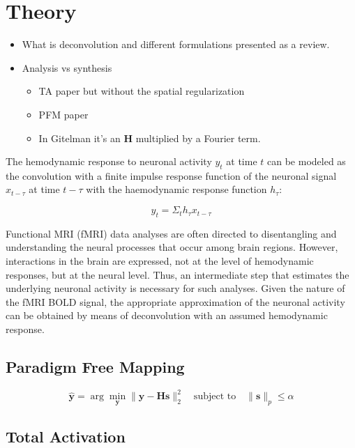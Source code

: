 \section{Theory}

\begin{itemize}
    \item What is deconvolution and different formulations presented as a review.
    \item Analysis vs synthesis
    \begin{itemize}
        \item TA paper but without the spatial regularization
        \item PFM paper
        \item In Gitelman it's an \(\mathbf{H}\) multiplied by a Fourier term.
    \end{itemize}
\end{itemize}

The hemodynamic response to neuronal activity \(y_t\) at time \(t\) can be modeled as the convolution with a finite impulse response function of the neuronal signal \(x_{t-\tau}\) at time \(t-\tau\) with the haemodynamic response function \(h_{\tau}\):

\begin{equation}
    y_t = \Sigma_t h_{\tau} x_{t-\tau}
\end{equation}

Functional MRI (fMRI) data analyses are often directed to disentangling and understanding the neural processes that occur among brain regions. However, interactions in the brain are expressed, not at the level of hemodynamic responses, but at the neural level. Thus, an intermediate step that estimates the underlying neuronal activity is necessary for such analyses. Given the nature of the fMRI BOLD signal, the appropriate approximation of the neuronal activity can be obtained by means of deconvolution with an assumed hemodynamic response\cite{gitelman2003modeling}.

\subsection{Paradigm Free Mapping}

\begin{equation}
    \hat{\mathbf{y}} = \arg \min_{\mathbf{y}} \| \mathbf{y} - \mathbf{Hs} \|_2^2 \quad \text{subject to} \quad \| \mathbf{s} \|_p \leq \alpha
\end{equation}

\subsection{Total Activation}